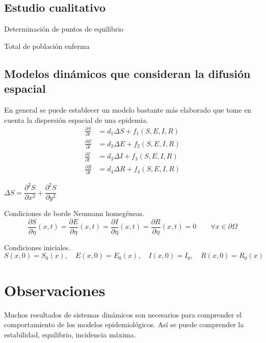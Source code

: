 \documentclass[a4paper, 10pt, twoside]{article}
\begin{document}
\subsection{Estudio cualitativo}

Determinación de puntos de equilibrio

Total de población enferma

\subsection{Modelos dinámicos que consideran la difusión espacial}
En general se puede establecer un modelo bastante más elaborado que tome en cuenta la dispersión 
espacial de una epidemia.
\begin{align}
\frac{\partial S}{\partial t} & = d_1 \Delta S + f_1( S, E, I, R) \\
\frac{\partial E}{\partial t} & = d_2 \Delta E + f_2( S, E, I, R) \nonumber \\
\frac{\partial I}{\partial t} & = d_3 \Delta I + f_3( S, E, I, R) \nonumber \\
\frac{\partial R}{\partial t} & = d_4 \Delta R + f_4( S, E, I, R) \nonumber
\end{align}

$\Delta S = \dfrac{\partial^2 S}{\partial x^2} + \dfrac{\partial^2 S}{\partial y^2}$

Condiciones de borde Neumann homegéneas.
\begin{equation}
\frac{\partial S}{\partial \eta}( x, t ) = 
\frac{\partial E}{\partial \eta}( x, t ) = 
\frac{\partial I}{\partial \eta}( x, t ) = 
\frac{\partial R}{\partial \eta}( x, t ) = 0 \qquad \forall x \in \partial \Omega
\end{equation}

Condiciones iniciales.
\begin{equation}
S( x, 0 ) = S_0( x ),\quad E( x, 0 ) = E_0( x ),\quad I( x, 0 ) = I_0,\quad R( x, 0 ) = R_0( x )
\end{equation}

\section{Observaciones}
Muchos resultados de sistemas dinámicos son necesarios para comprender el comportamiento de los 
modelos epidemiológicos. Así se puede comprender la estabilidad, equilibrio, incidencia máxima.
\end{document}
